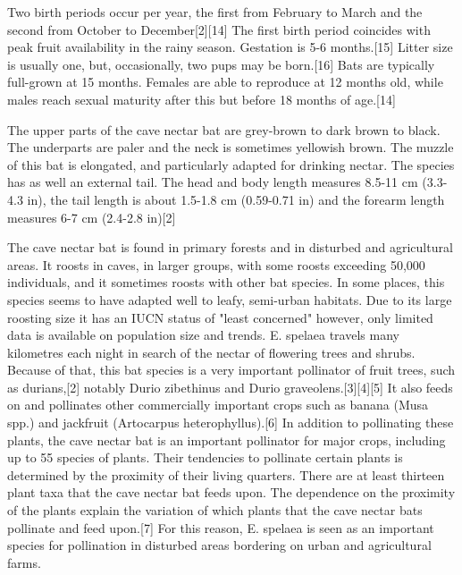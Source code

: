 \documentclass[twoside, 12pt, letterpaper]{report}\usepackage[]{graphicx}\usepackage[]{color}
\begin{document}
\begin{multicols*}{2}
Two birth periods occur per year, the first from February to March and the second from October to December[2][14] The first birth period coincides with peak fruit availability in the rainy season. Gestation is 5-6 months.[15] Litter size is usually one, but, occasionally, two pups may be born.[16] Bats are typically full-grown at 15 months. Females are able to reproduce at 12 months old, while males reach sexual maturity after this but before 18 months of age.[14]

The upper parts of the cave nectar bat are grey-brown to dark brown to black. The underparts are paler and the neck is sometimes yellowish brown. The muzzle of this bat is elongated, and particularly adapted for drinking nectar. The species has as well an external tail. The head and body length measures 8.5-11 cm (3.3-4.3 in), the tail length is about 1.5-1.8 cm (0.59-0.71 in) and the forearm length measures 6-7 cm (2.4-2.8 in)[2]

The cave nectar bat is found in primary forests and in disturbed and agricultural areas. It roosts in caves, in larger groups, with some roosts exceeding 50,000 individuals, and it sometimes roosts with other bat species. In some places, this species seems to have adapted well to leafy, semi-urban habitats. Due to its large roosting size it has an IUCN status of "least concerned" however, only limited data is available on population size and trends. E. spelaea travels many kilometres each night in search of the nectar of flowering trees and shrubs. Because of that, this bat species is a very important pollinator of fruit trees, such as durians,[2] notably Durio zibethinus and Durio graveolens.[3][4][5] It also feeds on and pollinates other commercially important crops such as banana (Musa spp.) and jackfruit (Artocarpus heterophyllus).[6] In addition to pollinating these plants, the cave nectar bat is an important pollinator for major crops, including up to 55 species of plants. Their tendencies to pollinate certain plants is determined by the proximity of their living quarters. There are at least thirteen plant taxa that the cave nectar bat feeds upon. The dependence on the proximity of the plants explain the variation of which plants that the cave nectar bats pollinate and feed upon.[7] For this reason, E. spelaea is seen as an important species for pollination in disturbed areas bordering on urban and agricultural farms.



\end{multicols*}
\end{document}
